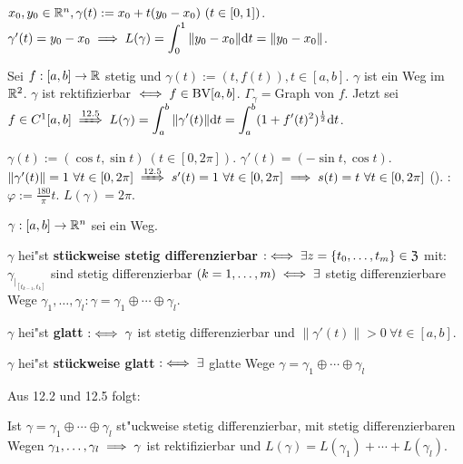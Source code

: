 \documentclass[a4paper,twoside,DIV15,BCOR12mm,chapterprefix=true,headings=twolinechapter]{scrbook}
\begin{document}
\begin{beispiele}
\item $x_0, y_0\in\mathbb{R}^n, \gamma(t):=x_0+t(y_0-x_0)\ (t\in [0,1])$. $\gamma'(t)=y_0-x_0\implies L(\gamma)=\displaystyle\int_0^1\|y_0-x_0\|\text{d}t=\|y_0-x_0\|$.
\item Sei $f:[a,b]\to\mathbb{R}$ stetig und $\gamma(t):=(t, f(t)), t\in[a,b]$. $\gamma$ ist ein Weg im $\mathbb{R}^2$. $\gamma$ ist rektifizierbar $\iff f \in \text{BV}[a,b]$. $\Gamma_\gamma=$Graph von $f$. Jetzt sei $f\in C^1[a,b] \folgtnach{12.5} L(\gamma)=\ds\int_a^b\|\gamma'(t)\|\text{d}t=\ds\int_a^b (1+f'(t)^2)^{\frac{1}{2}}\text{d}t$.
\item $\gamma(t):=(\cos t, \sin t)\ (t\in [0,2\pi])$. $\gamma'(t)=(-\sin t, \cos t)$. $\|\gamma'(t)\|=1\ \forall t\in [0,2\pi]\folgtnach{12.5}s'(t)=1\ \forall t\in[0,2\pi]\folgt s(t)=t\ \forall t\in[0,2\pi]$ (). : $\varphi:=\frac{180}{\pi}t$. $L(\gamma)=2\pi$.
\end{beispiele}

\begin{definition*}
$\gamma:[a,b]\to\mathbb{R}^n$ sei ein Weg.
\begin{liste}
\item $\gamma$ hei"st \textbf{stückweise stetig differenzierbar} $:\iff\exists z=\{t_0,\ldots,t_m\}\in\mathfrak{Z}$ mit: $\gamma_{|_{[t_{k-1},t_k]}}$ sind stetig differenzierbar $(k=1,\ldots,m)\iff\exists$ stetig differenzierbare Wege $\gamma_1,\ldots,\gamma_l: \gamma=\gamma_1\oplus\cdots\oplus\gamma_l$.
\item $\gamma$ hei"st \textbf{glatt} $:\iff \gamma$ ist stetig differenzierbar und $\|\gamma'(t)\|>0\ \forall t\in[a,b]$.
\item $\gamma$ hei"st \textbf{stückweise glatt} $:\iff\exists$ glatte Wege $\gamma=\gamma_1\oplus\cdots\oplus\gamma_l$
\end{liste}
\end{definition*}

Aus 12.2 und 12.5 folgt:

\begin{satz}
Ist $\gamma=\gamma_1\oplus\cdots\oplus\gamma_l$ st"uckweise stetig differenzierbar, mit stetig differenzierbaren Wegen $\gamma_1,\ldots,\gamma_l\implies \gamma$ ist rektifizierbar und $L(\gamma)=L(\gamma_1)+\cdots+L(\gamma_l)$.
\end{satz}
\end{document}
